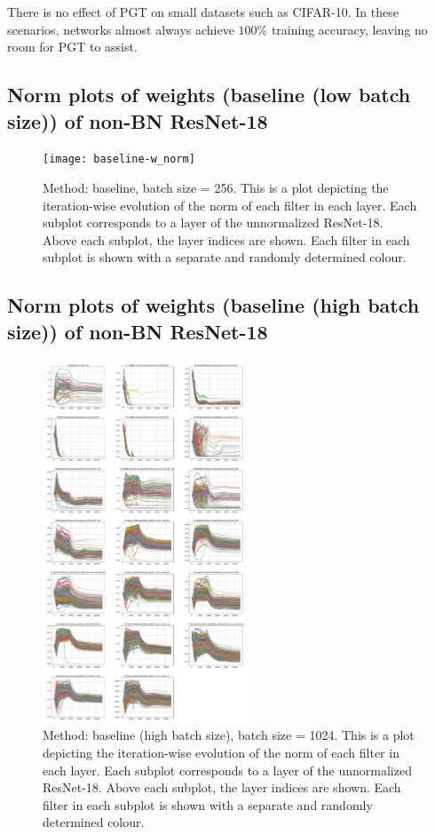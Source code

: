 \documentclass[times,sort&compress]{elsarticle}
\begin{document}
There is no effect of PGT on small datasets such as CIFAR-10. In these scenarios,
networks almost always achieve $100\%$ training accuracy, leaving no room for PGT to
assist.

\clearpage



\subsection{Norm plots of weights (baseline (low batch size)) of non-BN ResNet-18}
\begin{figure}[ht] \centering \texttt{[image: baseline-w\_norm]}
\caption{ Method: baseline, batch size = 256. This is a plot depicting the
iteration-wise evolution of the norm of each filter in each layer. Each subplot
corresponds to a layer of the unnormalized ResNet-18. Above each subplot, the layer
indices are shown. Each filter in each subplot is shown with a separate and randomly
determined colour. } \end{figure}

\clearpage


\subsection{Norm plots of weights (baseline (high batch size)) of non-BN ResNet-18}
\begin{figure}[ht] \centering
\includegraphics[width=0.55\textwidth]{baseline_high_bs-w_norm} \caption{ Method:
baseline (high batch size), batch size = 1024. This is a plot depicting the
iteration-wise evolution of the norm of each filter in each layer. Each subplot
corresponds to a layer of the unnormalized ResNet-18. Above each subplot, the layer
indices are shown. Each filter in each subplot is shown with a separate and randomly
determined colour. } \end{figure}
\end{document}
